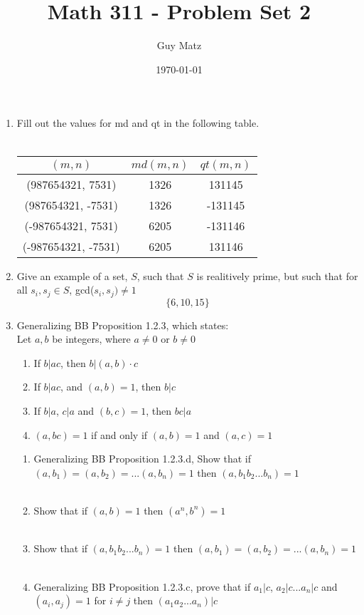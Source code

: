 \documentclass[11pt]{article}
\title{\textbf{Math 311 - Problem Set 2}}
\author{Guy Matz}
\date{\today}
\begin{document}


\begin{enumerate}  %
\item Fill out the values for md and qt in the following table.\\
\\
\begin{center}
  \begin{tabular}{ c | c | c }
    $(m,n)$ & $md(m,n)$ & $qt(m,n)$ \\ \hline
    (987654321, 7531) & 1326 & 131145 \\ \hline
    (987654321, -7531) & 1326 & -131145 \\ \hline
    (-987654321, 7531) & 6205 & -131146 \\ \hline
    (-987654321, -7531) & 6205 & 131146 \\ \hline
  \end{tabular}
\end{center}

\newpage %
\item Give an example of a set, $S$, such that $S$ is realitively prime, but such that for all $s_i, s_j \in S$, gcd($s_i, s_j) \neq 1$
$$\{6,10,15\}$$

\newpage %
\item Generalizing BB Proposition 1.2.3, which states: \\
Let $a, b$ be integers, where $a \neq 0$ or $b \neq 0$
\begin{enumerate}
\item If $b | ac$, then $b | (a,b) \cdot c$
\item If $b | ac$, and $(a, b) = 1$, then $b|c$
\item If $b | a$, $c | a$ and $(b, c) = 1$, then $bc|a$
\item $(a, bc) =1 $ if and only if $(a,b) = 1$ and $(a,c) = 1$
\end{enumerate}

\begin{enumerate}
\item Generalizing BB Proposition 1.2.3.d, Show that if $(a,b_1)=(a,b_2)=... (a,b_n)=1$ then $(a,b_1 b_2 ... b_n) = 1$\\
\\
\item Show that if $(a, b) = 1$ then $(a^n, b^n) = 1$\\
\\
\item Show that if $(a, b_1 b_2...b_n) = 1$ then $(a, b_1) = (a, b_2) = ... (a,b_n) = 1$\\
\\
\item Generalizing BB Proposition 1.2.3.c, prove that if $a_1 | c$, $a_2| c$...$a_n|c$ and $(a_i, a_j) = 1$ for $i \neq j$ then $(a_1 a_2...a_n)|c$


\end{enumerate}
\end{enumerate}
\end{document}
